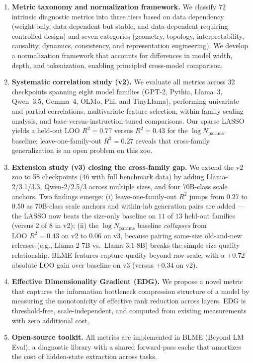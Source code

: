 \documentclass[preprint]{neurips_2025}
\begin{document}
\begin{enumerate}
  \item \textbf{Metric taxonomy and normalization framework.} We classify 72 intrinsic diagnostic metrics into three tiers based on data dependency (weight-only, data-dependent but stable, and data-dependent requiring controlled design) and seven categories (geometry, topology, interpretability, causality, dynamics, consistency, and representation engineering). We develop a normalization framework that accounts for differences in model width, depth, and tokenization, enabling principled cross-model comparison.

  \item \textbf{Systematic correlation study (v2).} We evaluate all metrics across 32 checkpoints spanning eight model families (GPT-2, Pythia, Llama~3, Qwen~3.5, Gemma~4, OLMo, Phi, and TinyLlama), performing univariate and partial correlations, multivariate feature selection, within-family scaling analysis, and base-versus-instruction-tuned comparisons. Our sparse LASSO yields a held-out $\text{LOO } R^2 = 0.77$ versus $R^2 = 0.43$ for the $\log N_{\text{params}}$ baseline; leave-one-family-out $R^2 = 0.27$ reveals that cross-family generalization is an open problem on this zoo.

  \item \textbf{Extension study (v3) closing the cross-family gap.} We extend the v2 zoo to 58 checkpoints (46 with full benchmark data) by adding Llama-2/3.1/3.3, Qwen-2/2.5/3 across multiple sizes, and four 70B-class scale anchors. Two findings emerge: (i) leave-one-family-out $R^2$ jumps from $0.27$ to $0.50$ as 70B-class scale anchors and within-lab generation pairs are added --- the LASSO now beats the size-only baseline on $11$ of $13$ held-out families (versus $2$ of $8$ in v2); (ii) the $\log N_{\text{params}}$ baseline \emph{collapses} from $\text{LOO } R^2 = 0.43$ on v2 to $0.06$ on v3, because pairing same-size old-and-new releases (e.g., Llama-2-7B vs.\ Llama-3.1-8B) breaks the simple size-quality relationship. BLME features capture quality beyond raw scale, with a +$0.72$ absolute LOO gain over baseline on v3 (versus $+0.34$ on v2).

  \item \textbf{Effective Dimensionality Gradient (EDG).} We propose a novel metric that captures the information bottleneck compression structure of a model by measuring the monotonicity of effective rank reduction across layers. EDG is threshold-free, scale-independent, and computed from existing measurements with zero additional cost.

  \item \textbf{Open-source toolkit.} All metrics are implemented in BLME (Beyond LM Eval), a diagnostic library with a shared forward-pass cache that amortizes the cost of hidden-state extraction across tasks.
\end{enumerate}
\end{document}
